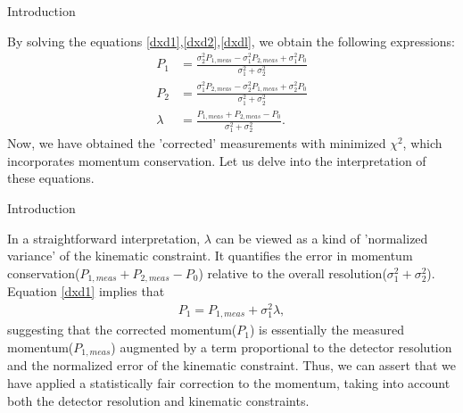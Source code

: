 \documentclass[
	xcolor=dvipsnames,
	10pt, 
	]{beamer}
\begin{document}
\begin{frame}{Introduction}
	\begin{block}{}
		By solving the equations \ref{dxd1},\ref{dxd2},\ref{dxdl}, we obtain the following expressions:
		\begin{align}
			P_1& =\frac{\sigma_2^2 P_{1,meas}-\sigma_1^2P_{2,meas}+\sigma_1^2P_0}{\sigma_1^2+\sigma_2^2}\\
			P_2& = \frac{\sigma_1^2 P_{2,meas}-\sigma_2^2P_{1,meas}+\sigma_2^2P_0}{\sigma_1^2+\sigma_2^2}\\
			\lambda&=\frac{P_{1,meas}+P_{2,meas}-P_0}{\sigma_1^2+\sigma_2^2}.
		\end{align}
			Now, we have obtained the 'corrected' measurements with minimized $\chi^2$, which incorporates momentum conservation.
			Let us delve into the interpretation of these equations.
	\end{block}
\end{frame}
\begin{frame}{Introduction}
	\begin{block}{}
			 In a straightforward interpretation, $\lambda$ can be viewed as a kind of 'normalized variance' of the kinematic constraint. It quantifies the error in momentum conservation($P_{1,meas}+P_{2,meas}-P_0$) relative to the overall resolution($\sigma_1^2+\sigma_2^2$).  Equation \eqref{dxd1} implies that 
\begin{align}
	P_{1}=P_{1,meas}+\sigma_1^2\lambda,
\end{align}
			suggesting that the corrected momentum($P_1$) is essentially the measured momentum($P_{1,meas}$) augmented by a term proportional to the detector resolution and the normalized error of the kinematic constraint. Thus, we can assert that we have applied a statistically fair correction to the momentum, taking into account both the detector resolution and kinematic constraints.
	\end{block}
\end{frame}
\end{document}
